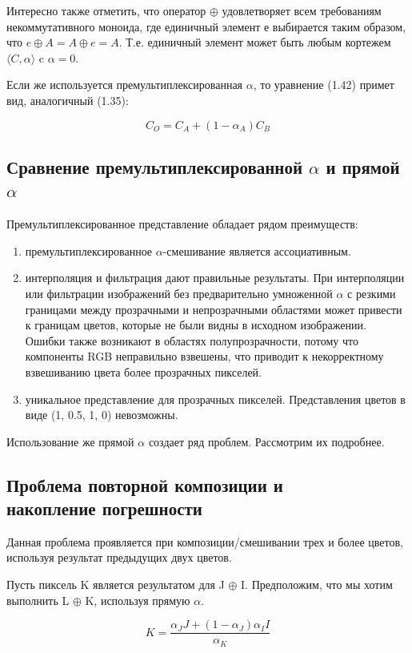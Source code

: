 Интересно также отметить, что оператор  $\oplus$ удовлетворяет всем требованиям некоммутативного моноида, где единичный элемент $е$ выбирается таким образом, что  $e\oplus A = A \oplus e = A$. Т.е. единичный элемент может быть любым кортежем $\langle C, \alpha \rangle$ c $\alpha = 0$.

Если же используется премультиплексированная $\alpha$, то уравнение (1.42) примет вид, аналогичный (1.35): 

\begin{equation}
C_{O} = C_{A} + (1-\alpha_{A})C_{B}
\end{equation}

\subsection{Сравнение премультиплексированной  $\alpha$ и прямой $\alpha$}
Премультиплексированное представление обладает рядом преимуществ: 
\begin{enumerate}
	\item премультиплексированное $\alpha$-смешивание является ассоциативным.
	\item интерполяция и фильтрация дают правильные результаты. При интерполяции или фильтрации изображений без предварительно умноженной $\alpha$ с резкими границами между прозрачными и непрозрачными областями  может привести к границам цветов, которые не были видны в исходном изображении. Ошибки также возникают в областях полупрозрачности, потому что компоненты RGB неправильно взвешены, что приводит к некорректному взвешиванию цвета более прозрачных пикселей.
	\item уникальное представление для прозрачных пикселей. Представления цветов в виде (1, 0.5, 1, 0) невозможны.
\end{enumerate}
Использование же прямой $\alpha$ создает ряд проблем. Рассмотрим их подробнее.
 
\subsection{Проблема повторной композиции и \\ накопление погрешности}
Данная проблема проявляется при композиции/смешивании трех и более цветов, используя результат предыдущих двух цветов.

Пусть пиксель K является результатом для  J $\oplus$ I. Предположим, что мы хотим выполнить L $\oplus$ K, используя прямую $\alpha$.

\begin{equation}
K = \frac{\alpha_{J}J + (1-\alpha_{J})\alpha_{I}I}{\alpha_{K}}
\end{equation}

